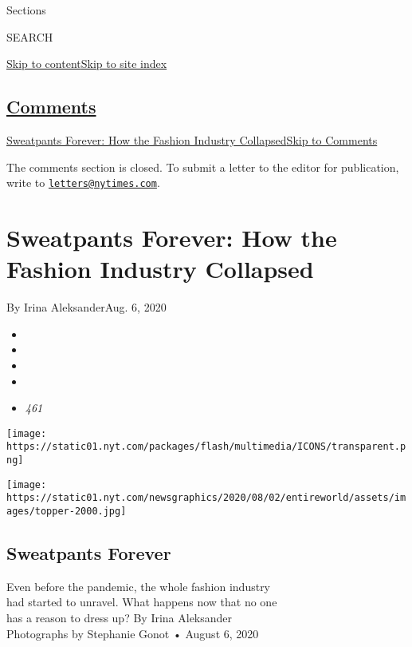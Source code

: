 Sections

SEARCH

\protect\hyperlink{site-content}{Skip to
content}\protect\hyperlink{site-index}{Skip to site index}

\hypertarget{comments}{%
\subsection{\texorpdfstring{\protect\hyperlink{commentsContainer}{Comments}}{Comments}}\label{comments}}

\href{}{Sweatpants Forever: How the Fashion Industry
Collapsed}\href{}{Skip to Comments}

The comments section is closed. To submit a letter to the editor for
publication, write to
\href{mailto:letters@nytimes.com}{\nolinkurl{letters@nytimes.com}}.

\hypertarget{sweatpants-forever-how-the-fashion-industry-collapsed}{%
\section{Sweatpants Forever: How the Fashion Industry
Collapsed}\label{sweatpants-forever-how-the-fashion-industry-collapsed}}

By Irina AleksanderAug. 6, 2020

\begin{itemize}
\item
\item
\item
\item
\item
  \emph{461}
\end{itemize}

\texttt{[image: https://static01.nyt.com/packages/flash/multimedia/ICONS/transparent.png]}

\texttt{[image: https://static01.nyt.com/newsgraphics/2020/08/02/entireworld/assets/images/topper-2000.jpg]}

\hypertarget{sweatpants-forever}{%
\subsection{Sweatpants Forever}\label{sweatpants-forever}}

Even before the pandemic, the whole fashion industry\\
had started to unravel. What happens now that no one\\
has a reason to dress up? By Irina Aleksander\\
Photographs by Stephanie Gonot • August 6, 2020

